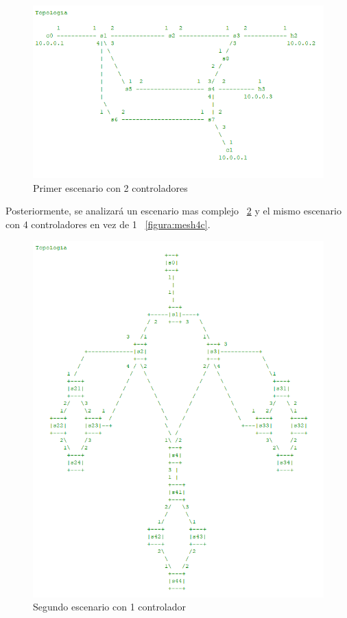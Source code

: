 \documentclass[a4paper, 12pt]{book}
\begin{document}
		\begin{figure}
			\centering
			\includegraphics[width=16cm, keepaspectratio]{img/2controllers}
			\caption{Primer escenario con 2 controladores}
			\label{figura:2controllers}
		\end{figure}
	
		Posteriormente, se analizará un escenario mas complejo ~\ref{figura:mesh} y el mismo escenario con 4 controladores en vez de 1 ~\ref{figura:mesh4c}.
	
		\begin{figure}
			\centering
			\includegraphics[width=16cm, keepaspectratio]{img/mesh}
			\caption{Segundo escenario con 1 controlador}
			\label{figura:mesh}
		\end{figure}
	
\end{document}
